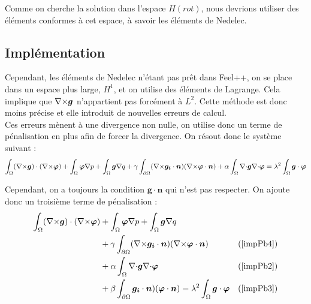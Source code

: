 Comme on cherche la solution dans l'espace $H(rot)$, nous devrions utiliser des éléments conformes à cet espace, à savoir les éléments de Nedelec.\\

\subsection{Implémentation}

Cependant, les éléments de Nedelec n'étant pas prêt dans Feel++, on se place dans un espace plus large, $H^1$, et on utilise des éléments de Lagrange. Cela implique que ${\nabla\times}\bm{g}$ n'appartient pas forcément à $L^2$. Cette méthode est donc moins précise et elle introduit de nouvelles erreurs de calcul.\\

Ces erreurs mènent à une divergence non nulle, on utilise donc un terme de pénalisation en plus afin de forcer la divergence. On résout donc le système suivant :
\[ \int_\Omega ({\nabla\times}\bm{g})\cdot({\nabla\times}\bm{\varphi}) + \int_\Omega\bm{\varphi}{\nabla} p + \int_\Omega \bm{g}{\nabla} q + \gamma\int_{\partial\Omega}({\nabla\times}\bm{g_i}\cdot\bm{n})({\nabla\times}\bm{\varphi}\cdot\bm{n}) + \alpha\int_\Omega {\nabla\cdot}\bm{g}{\nabla\cdot}\bm{\varphi} = \lambda^2\int_\Omega \bm{g}\cdot\bm{\varphi} \]

Cependant, on a toujours la condition $\bm{g}\cdot\bm{n}$ qui n'est pas respecter. On ajoute donc un troisième terme de pénalisation :
\begin{align*}
\int_\Omega ({\nabla\times}\bm{g})\cdot({\nabla\times}\bm{\varphi}) &+ \int_\Omega\bm{\varphi}{\nabla} p + \int_\Omega \bm{g}{\nabla} q & \\
&+ \gamma\int_{\partial\Omega}({\nabla\times}\bm{g_i}\cdot\bm{n})({\nabla\times}\bm{\varphi}\cdot\bm{n}) & (\ref{impPb4})\\
& + \alpha\int_\Omega {\nabla\cdot}\bm{g}{\nabla\cdot}\bm{\varphi} & (\ref{impPb2})\\
&+ \beta\int_{\partial\Omega}\bm{g_i}\cdot\bm{n})(\bm{\varphi}\cdot\bm{n})  = \lambda^2\int_\Omega \bm{g}\cdot\bm{\varphi} & (\ref{impPb3})
\end{align*}

